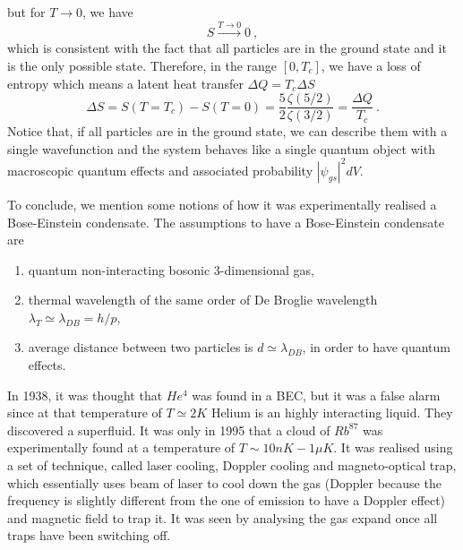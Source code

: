     but for $T \rightarrow 0$, we have 
    \begin{equation*}
        S \xrightarrow{T \rightarrow 0} 0 ~,
    \end{equation*} 
    which is consistent with the fact that all particles are in the ground state and it is the only possible state. Therefore, in the range $[0, T_c]$, we have a loss of entropy which means a latent heat transfer $\Delta Q = T_c \Delta S$
    \begin{equation*}
        \Delta S = S(T=T_c) - S(T=0) = \frac{5}{2} \frac{\zeta(5/2)}{\zeta(3/2)} = \frac{\Delta Q}{T_c} ~.
    \end{equation*}
    Notice that, if all particles are in the ground state, we can describe them with a single wavefunction and the system behaves like a single quantum object with macroscopic quantum effects and associated probability $|\psi_{gs}|^2 dV$. 

    To conclude, we mention some notions of how it was experimentally realised a Bose-Einstein condensate. The assumptions to have a Bose-Einstein condensate are 
    \begin{enumerate}
        \item quantum non-interacting bosonic $3$-dimensional gas, 
        \item thermal wavelength of the same order of De Broglie wavelength $\lambda_T \simeq \lambda_{DB} = h / p$,
        \item average distance between two particles is $d \simeq \lambda_{DB}$, in order to have quantum effects.
    \end{enumerate}
    In 1938, it was thought that $He^4$ was found in a BEC, but it was a false alarm since at that temperature of $T \simeq 2 K$ Helium is an highly interacting liquid. They discovered a superfluid. It was only in 1995 that a cloud of $Rb^{87}$ was experimentally found at a temperature of $T \sim 10 nK - 1 \mu K$. It was realised using a set of technique, called laser cooling, Doppler cooling and magneto-optical trap, which essentially uses beam of laser to cool down the gas (Doppler because the frequency is slightly different from the one of emission to have a Doppler effect) and magnetic field to trap it. It was seen by analysing the gas expand once all traps have been switching off. 

